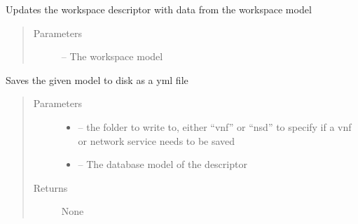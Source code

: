 \documentclass[letterpaper,10pt,english]{sphinxmanual}
\begin{document}

\begin{fulllineitems}
\label{_source/son_editor.util:son_editor.util.descriptorutil.update_workspace_descriptor}
Updates the workspace descriptor with data from the workspace model
\begin{quote}\begin{description}
\item[{Parameters}] \leavevmode
{} -- The workspace model

\end{description}\end{quote}

\end{fulllineitems}


\begin{fulllineitems}
\label{_source/son_editor.util:son_editor.util.descriptorutil.write_ns_vnf_to_disk}
Saves the given model to disk as a yml file
\begin{quote}\begin{description}
\item[{Parameters}] \leavevmode\begin{itemize}
\item {} 
 -- the folder to write to, either ``vnf'' or ``nsd''
to specify if a vnf or network service needs to be saved

\item {} 
 -- The database  model of the descriptor

\end{itemize}

\item[{Returns}] \leavevmode
None

\end{description}\end{quote}

\end{fulllineitems}
\end{document}
